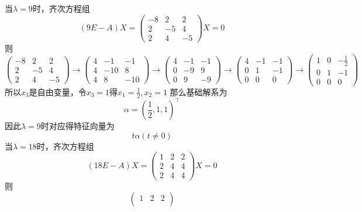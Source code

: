 \begin{solution}
    当$\lambda=9$时，齐次方程组
    \[
        (9E - A)X =
        \begin{pmatrix}
            -8 & 2  & 2  \\
            2  & -5 & 4  \\
            2  & 4  & -5
        \end{pmatrix}X
        =0
    \]
    则
    \[
        \begin{pmatrix}
            -8 & 2  & 2  \\
            2  & -5 & 4  \\
            2  & 4  & -5
        \end{pmatrix}
        \longrightarrow
        \begin{pmatrix}
            4 & -1  & -1  \\
            4 & -10 & 8   \\
            4 & 8   & -10
        \end{pmatrix}
        \longrightarrow
        \begin{pmatrix}
            4 & -1 & -1 \\
            0 & -9 & 9  \\
            0 & 9  & -9
        \end{pmatrix}
        \longrightarrow
        \begin{pmatrix}
            4 & -1 & -1 \\
            0 & 1  & -1 \\
            0 & 0  & 0
        \end{pmatrix}
        \longrightarrow
        \begin{pmatrix}
            1 & 0 & -\frac{1}{2} \\
            0 & 1 & -1           \\
            0 & 0 & 0
        \end{pmatrix}
    \]
    所以$x_3$是自由变量，令$x_3=1$得$x_1=\frac{1}{2},x_2=1$
    那么基础解系为
    \[
        \alpha = (\frac{1}{2},1,1)^\intercal
    \]
    因此$\lambda = 9$时对应得特征向量为
    \[ t\alpha (t\neq 0) \]
    当$\lambda=18$时，齐次方程组
    \[
        (18E - A)X =
        \begin{pmatrix}
            1 & 2 & 2 \\
            2 & 4 & 4 \\
            2 & 4 & 4
        \end{pmatrix}X
        =0
    \]
    则
    \[
        \begin{pmatrix}
            1 & 2 & 2 \\

\end{pmatrix}\]
\end{solution}

